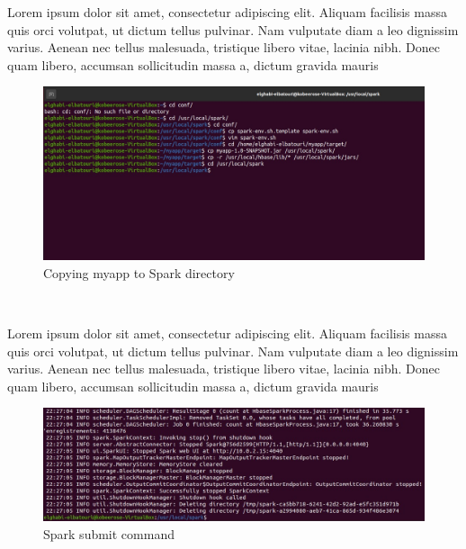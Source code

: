 \begin{spacing}{1.2}
\par Lorem ipsum dolor sit amet, consectetur adipiscing elit. Aliquam facilisis massa quis orci volutpat, ut dictum tellus pulvinar. Nam vulputate diam a leo dignissim varius. Aenean nec tellus malesuada, tristique libero vitae, lacinia nibh. Donec quam libero, accumsan sollicitudin massa a, dictum gravida mauris
\\
\begin{figure}[!htb] 
\begin{center} 
\includegraphics[width=1\linewidth]{Pictures/HBase/Data processing with Spark/Installing and Configuring Spark-2.4.3/Copying myapp to Spark directory} 
\end{center} 
\caption{Copying myapp to Spark directory} 
\end{figure}  \FloatBarrier
\\

\par Lorem ipsum dolor sit amet, consectetur adipiscing elit. Aliquam facilisis massa quis orci volutpat, ut dictum tellus pulvinar. Nam vulputate diam a leo dignissim varius. Aenean nec tellus malesuada, tristique libero vitae, lacinia nibh. Donec quam libero, accumsan sollicitudin massa a, dictum gravida mauris
\\
\begin{figure}[!htb] 
\begin{center} 
\includegraphics[width=1\linewidth]{Pictures/HBase/Data processing with Spark/Installing and Configuring Spark-2.4.3/Spark submit command} 
\end{center} 
\caption{Spark submit command} 
\end{figure}  \FloatBarrier
\\

\end{spacing}